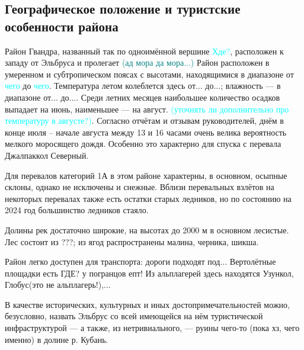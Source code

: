 \subsection{Географическое положение и туристские особенности района}
Район Гвандра, названный так по одноимённой вершине \textcolor{cyan}{Хде?},  расположен к западу от Эльбруса и пролегает \textcolor{teal}{(ад мора да мора...)} Район расположен в умеренном и субтропическом поясах с высотами, находящимися в диапазоне от \textcolor{cyan}{чего} до \textcolor{cyan}{чего}. Температура летом колеблется здесь от... до...; влажность — в диапазоне от... до.... Среди летних месяцев наибольшее количество осадков выпадает на июнь, наименьшее — на август. \textcolor{cyan}{(уточнять ли дополнительно про температуру в августе?)}. Согласно отчётам и отзывам руководителей, днём в конце июля – начале августа между 13 и 16 часами очень велика  вероятность мелкого моросящего дождя. Особенно это характерно для спуска с перевала Джалпаккол Северный.

Для перевалов категорий 1А в этом районе характерны, в основном, осыпные склоны, однако не исключены и снежные. Вблизи перевальных взлётов на некоторых перевалах также есть остатки старых ледников, но по состоянию на 2024 год большинство ледников  стаяло. 

Долины рек достаточно широкие, на высотах до 2000 м в основном лесистые. Лес состоит из ???; из ягод распространены малина, черника, шикша. 

Район легко доступен для транспорта: дороги подходят под... Вертолётные площадки есть ГДЕ? у погранцов епт! Из альплагерей здесь находятся Узункол, Глобус(это не альплагерь!),... 

В качестве исторических, культурных и иных достопримечательностей можно, безусловно, назвать Эльбрус со всей имеющейся на нём туристической инфраструктурой — а также, из нетривиального, — руины чего-то (пока хз, чего именно) в долине р. Кубань. 

\newpage